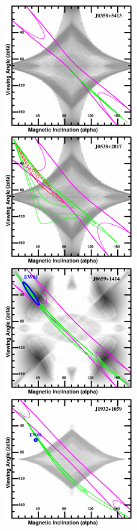 \begin{figure}[htbp]
\includegraphics[width=0.5\textwidth]{chapters/multiWaveLength/figures/f3cor_a.eps}
\includegraphics[width=0.5\textwidth]{chapters/multiWaveLength/figures/f3cor_b.eps}
\includegraphics[width=0.5\textwidth]{chapters/multiWaveLength/figures/f3cor_c.eps}
\includegraphics[width=0.5\textwidth]{chapters/multiWaveLength/figures/f3cor_d.eps}

\end{figure}
